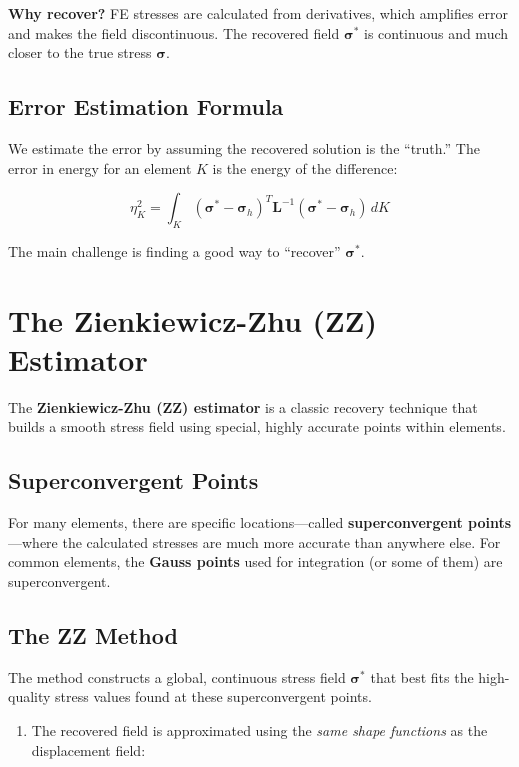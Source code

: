 \documentclass[
  11pt,
  a4paper,
]{scrbook}
\providecommand{\tightlist}{%
  \setlength{\itemsep}{0pt}\setlength{\parskip}{0pt}}\usepackage{longtable,booktabs,array}
\begin{document}
\textbf{Why recover?} FE stresses are calculated from derivatives, which
amplifies error and makes the field discontinuous. The recovered field
\(\boldsymbol{\sigma}^*\) is continuous and much closer to the true
stress \(\boldsymbol{\sigma}\).

\subsection{Error Estimation Formula}\label{error-estimation-formula}

We estimate the error by assuming the recovered solution is the
``truth.'' The error in energy for an element \(K\) is the energy of the
difference:

\[\eta_K^2 = \int_{K} (\boldsymbol{\sigma}^* - \boldsymbol{\sigma}_h)^T \mathbf{L}^{-1} (\boldsymbol{\sigma}^* - \boldsymbol{\sigma}_h) \, dK\]

The main challenge is finding a good way to ``recover''
\(\boldsymbol{\sigma}^*\).

\section{The Zienkiewicz-Zhu (ZZ)
Estimator}\label{the-zienkiewicz-zhu-zz-estimator}

The \textbf{Zienkiewicz-Zhu (ZZ) estimator} is a classic recovery
technique that builds a smooth stress field using special, highly
accurate points within elements.

\subsection{Superconvergent Points}\label{superconvergent-points}

For many elements, there are specific locations---called
\textbf{superconvergent points}---where the calculated stresses are much
more accurate than anywhere else. For common elements, the \textbf{Gauss
points} used for integration (or some of them) are superconvergent.

\subsection{The ZZ Method}\label{the-zz-method}

The method constructs a global, continuous stress field
\(\boldsymbol{\sigma}^*\) that best fits the high-quality stress values
found at these superconvergent points.

\begin{enumerate}
\def\labelenumi{\arabic{enumi}.}
\tightlist
\item
  The recovered field is approximated using the \emph{same shape
  functions} as the displacement field:
\end{enumerate}
\end{document}
